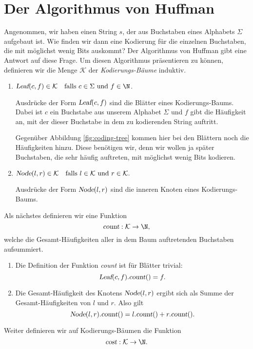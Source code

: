 \section{Der Algorithmus von Huffman}
Angenommen, wir haben einen String $s$, der aus Buchstaben eines Alphabets $\Sigma$
aufgebaut ist.  Wie finden wir dann eine Kodierung f\"ur die einzelnen Buchstaben, die
mit m\"oglichst wenig Bits auskommt?  Der Algorithmus von Huffman gibt eine Antwort auf diese
Frage. Um diesen Algorithmus pr\"asentieren zu k\"onnen, definieren wir die Menge
$\mathcal{K}$ der \emph{Kodierungs-B\"aume} induktiv.  
\begin{enumerate}
\item $\textsl{Leaf}(c,f) \in \mathcal{K} \quad \mbox{falls $c \in \Sigma$ und $f \in \N$}$.

      Ausdr\"ucke der Form $\textsl{Leaf}(c,f)$ sind die Bl\"atter eines Kodierungs-Baums.
      Dabei ist $c$ ein Buchstabe aus unserem Alphabet $\Sigma$ und $f$ gibt die
      H\"aufigkeit an, mit der dieser Buchstabe in dem zu kodierenden String auftritt.

      Gegen\"uber Abbildung \ref{fig:coding-tree} kommen hier bei den Bl\"attern noch die
      H\"aufigkeiten hinzu.  Diese ben\"otigen wir, denn wir wollen ja sp\"ater Buchstaben,
      die sehr h\"aufig auftreten, mit m\"oglichst wenig Bits kodieren.  

\item $\textsl{Node}(l,r) \in \mathcal{K} \quad 
       \mbox{falls $l \in\mathcal{K}$ und $r \in \mathcal{K}$.}$ 

      Ausdr\"ucke der Form $\textsl{Node}(l,r)$ sind die inneren Knoten eines
      Kodierungs-Baums.  
\end{enumerate}
Als n\"achstes  definieren wir eine Funktion 
\[  \textsl{count} : \mathcal{K} \rightarrow \N, \]
welche die  Gesamt-H\"aufigkeiten aller in dem Baum auftretenden Buchstaben aufsummiert.
\begin{enumerate}
\item Die Definition der Funktion \textsl{count} ist f\"ur Bl\"atter trivial:
      \[ \textsl{Leaf}(c,f).\textsl{count}() = f. \]
\item Die Gesamt-H\"aufigkeit des Knotens $\textsl{Node}(l,r)$
      ergibt sich als Summe der Gesamt-H\"aufigkeiten von $l$ und $r$. Also gilt
      \[ \textsl{Node}(l,r).\textsl{count}() = l.\textsl{count}() + r.\textsl{count}(). \]
\end{enumerate}
Weiter definieren wir auf Kodierungs-B\"aumen die Funktion
\[ \textsl{cost}: \mathcal{K} \rightarrow \N. \]
